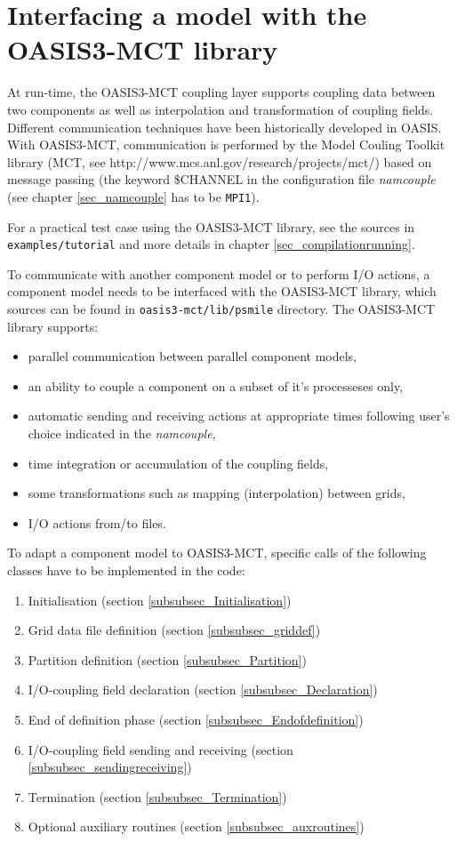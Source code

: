 \newpage
\chapter{Interfacing a model with the OASIS3-MCT library}
\label{sec_modelinterfacing}

At run-time, the OASIS3-MCT coupling layer supports coupling data
between two components as well as interpolation and transformation
of coupling fields. Different communication techniques have been historically
developed in OASIS. With OASIS3-MCT, communication is performed by the Model Couling Toolkit library (MCT, see http://www.mcs.anl.gov/research/projects/mct/) based on message passing (the keyword \$CHANNEL in the configuration file {\it namcouple}  (see chapter \ref{sec_namcouple} has to be {\tt MPI1}). 

For a practical test case using the OASIS3-MCT library, see the sources in
{\tt examples/tutorial} and more details in chapter \ref{sec_compilationrunning}.

To communicate with another component model or to perform I/O actions, a component model needs to be interfaced with the OASIS3-MCT library, which sources can be found in {\tt oasis3-mct/lib/psmile} directory. The OASIS3-MCT library supports:

\begin{itemize}
\item parallel communication between parallel component models,
\item an ability to couple a component on a subset of it's processeses only,
\item automatic sending and receiving actions at appropriate times
 following user's choice indicated in the {\it namcouple},
\item time integration or accumulation of the coupling fields,
\item some transformations such as mapping (interpolation) between grids,
\item I/O actions from/to files.
\end{itemize}

To adapt a component model to OASIS3-MCT, specific calls of
 the following classes have to be implemented in the code:

\begin{enumerate}
\item Initialisation (section \ref{subsubsec_Initialisation})
\item Grid data file definition (section \ref{subsubsec_griddef})
\item Partition definition (section \ref{subsubsec_Partition})
\item I/O-coupling field declaration (section \ref{subsubsec_Declaration})
\item End of definition phase (section \ref{subsubsec_Endofdefinition})
\item I/O-coupling field sending and receiving (section
\ref{subsubsec_sendingreceiving})
\item Termination (section \ref{subsubsec_Termination})
\item Optional auxiliary routines (section \ref{subsubsec_auxroutines})
\end{enumerate}

